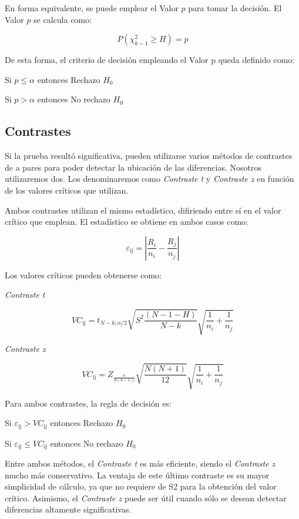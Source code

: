 \documentclass[]{book}
\theoremstyle{definition}
\theoremstyle{definition}
\theoremstyle{definition}
\theoremstyle{remark}
\begin{document}
En forma equivalente, se puede emplear el Valor \(p\) para tomar la
decisión. El Valor \(p\) se calcula como:

\[
P\left( \chi_{k - 1}^{2} \geq H \right) = p
\]

De esta forma, el criterio de decisión empleando el Valor p queda
definido como:

Si \(p \leq \alpha\) entonces Rechazo \(H_{0}\)

Si \(p > \alpha\) entonces No rechazo \(H_{0}\)

\hypertarget{contrastes-3}{%
\subsection{Contrastes}\label{contrastes-3}}

Si la prueba resultó significativa, pueden utilizarse varios métodos de
contrastes de a pares para poder detectar la ubicación de las
diferencias. Nosotros utilizaremos dos. Los denominaremos como
\emph{Contraste t} y \emph{Contraste z} en función de los valores
críticos que utilizan.

Ambos contrastes utilizan el mismo estadístico, difiriendo entre sí en
el valor crítico que emplean. El estadístico se obtiene en ambos casos
como:

\[
\varepsilon_{\text{ij}} = \left| \frac{R_{i}}{n_{i}} - \frac{R_{j}}{n_{j}} \right|
\]

Los valores críticos pueden obtenerse como:

\emph{Contraste t}

\[
VC_{\text{ij}} = t_{N - k;\alpha/2}\sqrt{S^{2}\frac{\left( N - 1 - H \right)}{N - k}}\sqrt{\frac{1}{n_{i}} + \frac{1}{n_{j}}}
\]

\emph{Contraste z}

\[
VC_{\text{ij}} = Z_{\frac{\alpha}{\lbrack k\left( k - 1 \right)\rbrack}}\sqrt{\frac{N\left( N + 1 \right)}{12}}\sqrt{\frac{1}{n_{i}} + \frac{1}{n_{j}}}
\]

Para ambos contrastes, la regla de decisión es:

Si \(\varepsilon_{\text{ij}} > VC_{\text{ij}}\) entonces Rechazo
\(H_{0}\)

Si \(\varepsilon_{\text{ij}} \leq VC_{\text{ij}}\) entonces No rechazo
\(H_{0}\)

Entre ambos métodos, el \emph{Contraste t} es más eficiente, siendo el
\emph{Contraste z} mucho más conservativo. La ventaja de este último
contraste es su mayor simplicidad de cálculo, ya que no requiere de S2
para la obtención del valor crítico. Asimismo, el \emph{Contraste z}
puede ser útil cuando sólo se desean detectar diferencias altamente
significativas.
\end{document}
